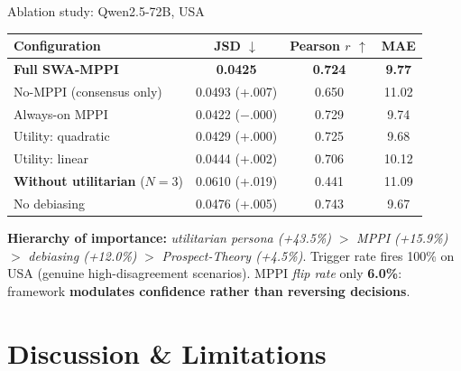 \documentclass[10pt,aspectratio=169]{beamer}
\newcommand{\gain}[1]{\textcolor{gaingreen}{#1}}
\newcommand{\loss}[1]{\textcolor{lossred}{#1}}
\begin{document}
\begin{frame}{Ablation study: Qwen2.5-72B, USA}
  \centering\small
  \begin{tabular}{lccc}
    \toprule
    \textbf{Configuration} & \textbf{JSD} $\downarrow$ & \textbf{Pearson $r$} $\uparrow$ & \textbf{MAE} \\
    \midrule
    \textbf{Full SWA-MPPI}                  & \textbf{0.0425} & \textbf{0.724} & \textbf{9.77} \\
    \midrule
    No-MPPI (consensus only)                & 0.0493 \loss{(+.007)} & 0.650 & 11.02 \\
    Always-on MPPI                          & 0.0422 \gain{($-$.000)} & 0.729 & 9.74 \\
    Utility: quadratic                      & 0.0429 \loss{(+.000)} & 0.725 & 9.68 \\
    Utility: linear                         & 0.0444 \loss{(+.002)} & 0.706 & 10.12 \\
    \textbf{Without utilitarian} ($N{=}3$)  & 0.0610 \loss{(+.019)} & 0.441 & 11.09 \\
    No debiasing                            & 0.0476 \loss{(+.005)} & 0.743 & 9.67 \\
    \bottomrule
  \end{tabular}
  \vspace{0.4em}

  \footnotesize\textbf{Hierarchy of importance:}
  \emph{utilitarian persona (+43.5\%)} $>$ \emph{MPPI (+15.9\%)} $>$ \emph{debiasing (+12.0\%)} $>$ \emph{Prospect-Theory (+4.5\%)}.
  Trigger rate fires 100\% on USA (genuine high-disagreement scenarios). MPPI \emph{flip rate} only \textbf{6.0\%}: framework \textbf{modulates confidence rather than reversing decisions}.
\end{frame}

\section{Discussion \& Limitations}
\end{document}
